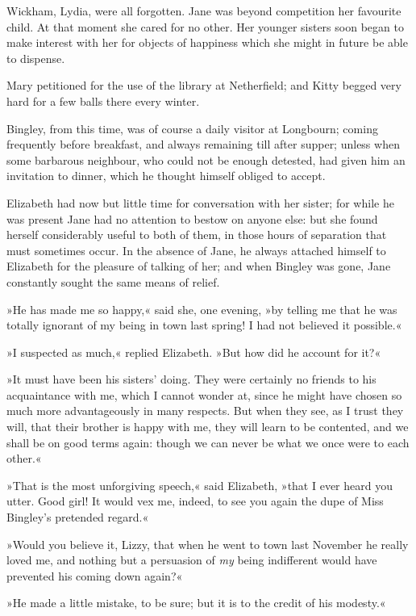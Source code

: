 Wickham, Lydia, were all forgotten. Jane was beyond competition her favourite child. At that moment she cared for no other. Her younger sisters soon began to make interest with her for objects of happiness which she might in future be able to dispense.

Mary petitioned for the use of the library at Netherfield; and Kitty begged very hard for a few balls there every winter.

Bingley, from this time, was of course a daily visitor at Longbourn; coming frequently before breakfast, and always remaining till after supper; unless when some barbarous neighbour, who could not be enough detested, had given him an invitation to dinner, which he thought himself obliged to accept.

Elizabeth had now but little time for conversation with her sister; for while he was present Jane had no attention to bestow on anyone else: but she found herself considerably useful to both of them, in those hours of separation that must sometimes occur. In the absence of Jane, he always attached himself to Elizabeth for the pleasure of talking of her; and when Bingley was gone, Jane constantly sought the same means of relief.

»He has made me so happy,« said she, one evening, »by telling me that he was totally ignorant of my being in town last spring! I had not believed it possible.«

»I suspected as much,« replied Elizabeth. »But how did he account for it?«

»It must have been his sisters' doing. They were certainly no friends to his acquaintance with me, which I cannot wonder at, since he might have chosen so much more advantageously in many respects. But when they see, as I trust they will, that their brother is happy with me, they will learn to be contented, and we shall be on good terms again: though we can never be what we once were to each other.«

»That is the most unforgiving speech,« said Elizabeth, »that I ever heard you utter. Good girl! It would vex me, indeed, to see you again the dupe of Miss Bingley's pretended regard.«

»Would you believe it, Lizzy, that when he went to town last November he really loved me, and nothing but a persuasion of \textit{my} being indifferent would have prevented his coming down again?«

»He made a little mistake, to be sure; but it is to the credit of his modesty.«

